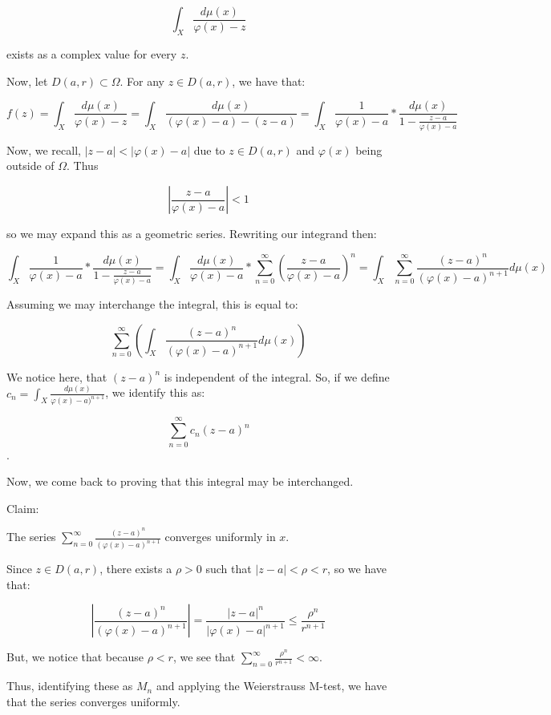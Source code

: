 \documentclass[10pt]{article}
\begin{document}
$$\int_X \frac{d\mu(x)}{\varphi(x) - z} $$

exists as a complex value for every $z$.

Now, let $D(a,r) \subset \Omega$. For any $z \in D(a,r)$, we have that:

$$ f(z) = \int_X \frac{d\mu(x)}{\varphi(x) - z}  = \int_X \frac{d\mu(x)}{(\varphi(x) - a) - (z - a)} =  \int_X \frac{1}{\varphi(x) - a} * \frac{d\mu(x)}{1 - \frac{z - a}{\varphi(x) - a}} $$

Now, we recall, $|z - a| < | \varphi(x) - a|$ due to $z \in D(a,r)$ and $\varphi(x)$ being outside of $\Omega$. Thus 

$$ \left|\frac{z - a}{\varphi(x) - a}\right| < 1 $$

so we may expand this as a geometric series. Rewriting our integrand then:

$$\int_X \frac{1}{\varphi(x) - a} * \frac{d\mu(x)}{1 - \frac{z - a}{\varphi(x) - a}} =  \int_X \frac{d\mu(x)}{\varphi(x) - a} * \sum_{n=0}^\infty \left( \frac{z - a}{\varphi(x) - a} \right)^n = \int_X \sum_{n=0}^\infty \frac{(z-a)^n}{(\varphi(x) - a)^{n+1}} d\mu(x) $$

Assuming we may interchange the integral, this is equal to:

$$\sum_{n=0}^\infty \left( \int_X \frac{(z-a)^n}{(\varphi(x) - a)^{n+1}} d\mu(x) \right)$$

We notice here, that $(z-a)^n$ is independent of the integral. So, if we define $c_n = \int_X \frac{d\mu(x)}{\varphi(x) - a)^{n+1}}$, we identify this as:

$$ \sum_{n=0}^\infty c_n (z-a)^n $$.

Now, we come back to proving that this integral may be interchanged.

Claim:

The series $\sum_{n=0}^\infty \frac{(z-a)^n}{(\varphi(x) - a)^{n+1}}$ converges uniformly in $x$.

Since $z \in D(a,r)$, there exists a $\rho > 0$ such that $|z-a| < \rho < r$, so we have that:

$$ \left| \frac{(z-a)^n}{(\varphi(x) - a)^{n+1}} \right| = \frac{|z-a|^n}{|\varphi(x) - a|^{n+1}} \leq \frac{\rho^n}{r^{n+1}}$$

But, we notice that because $\rho < r$, we see that $\sum_{n=0}^\infty \frac{\rho^n}{r^{n+1}} < \infty$.

Thus, identifying these as $M_n$ and applying the Weierstrauss M-test, we have that the series converges uniformly.
\end{document}
